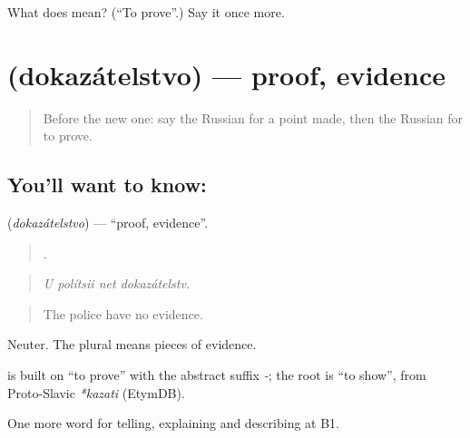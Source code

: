 \begin{tcolorbox}[breakable,colback=teal!4,colframe=teal!35!black,title={Before you move on}]
What does  mean? (\textquotedblleft{}To prove\textquotedblright{}.) Say it once more.
\end{tcolorbox}
\section[\texorpdfstring{\ru{доказательство} (dokazátelstvo)}{доказательство (dokazátelstvo)}]{ (dokazátelstvo) — proof, evidence}

\label{lesson:RU-C338-dokazatelstvo}



\begin{quote}
Before the new one: say the Russian for a point made, then the Russian for to prove.
\end{quote}

\subsection*{You'll want to know: }
\textbf{} (\emph{dokazátelstvo}) — \textquotedblleft{}proof, evidence\textquotedblright{}.

\begin{quote}
   .
\end{quote}

\begin{quote}
\emph{U polítsii net dokazátelstv.}
\end{quote}

\begin{quote}
The police have no evidence.
\end{quote}

Neuter. The plural \emph{} means pieces of evidence.

\begin{cousinweb}
\textbf{} is built on \emph{} \textquotedblleft{}to prove\textquotedblright{} with the abstract suffix \emph{-}; the root is \emph{} \textquotedblleft{}to show\textquotedblright{}, from Proto-Slavic \emph{*kazati} (EtymDB).
\end{cousinweb}

\begin{grammarlens}[title={What you've built}]
One more word for telling, explaining and describing at B1.
\end{grammarlens}


